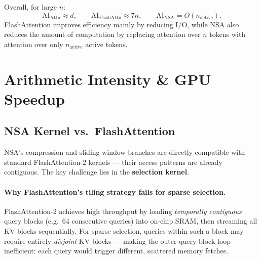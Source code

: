\documentclass[10pt,twocolumn]{article}
\begin{document}
Overall, for large $n$:
\[
  \mathrm{AI}_{\mathrm{Attn}} \approx d, \qquad
  \mathrm{AI}_{\mathrm{FlashAttn}} \approx 7n, \qquad
  \mathrm{AI}_{\mathrm{NSA}} = O(n_{\mathrm{active}}).
\]
FlashAttention improves efficiency mainly by reducing I/O, while NSA also reduces the
amount of computation by replacing attention over $n$ tokens with attention over only
$n_{\mathrm{active}}$ active tokens.

\section{Arithmetic Intensity \& GPU Speedup}

\subsection{NSA Kernel vs.\ FlashAttention}

NSA's compression and sliding window branches are directly compatible with standard
FlashAttention-2 kernels — their access patterns are already contiguous.
The key challenge lies in the \textbf{selection kernel}.

\paragraph{Why FlashAttention's tiling strategy fails for sparse selection.}
FlashAttention-2 achieves high throughput by loading \emph{temporally contiguous}
query blocks (e.g.\ 64 consecutive queries) into on-chip SRAM, then streaming
all KV blocks sequentially.
For sparse selection, queries within such a block may require entirely \emph{disjoint}
KV blocks — making the outer-query-block loop inefficient:
each query would trigger different, scattered memory fetches.
\end{document}
